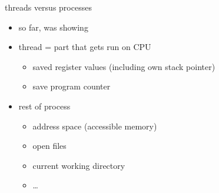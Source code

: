 \usetikzlibrary{chains,fit,matrix}

\begin{frame}{threads versus processes}
\begin{itemize}
\item so far, was showing 
\vspace{.5cm}
\item thread = part that gets run on CPU
    \begin{itemize}
    \item saved register values (including own stack pointer)
    \item save program counter
    \end{itemize}
\item rest of process
    \begin{itemize}
    \item address space (accessible memory)
    \item open files
    \item current working directory
    \item \ldots
    \end{itemize}
\end{itemize}
\end{frame}

